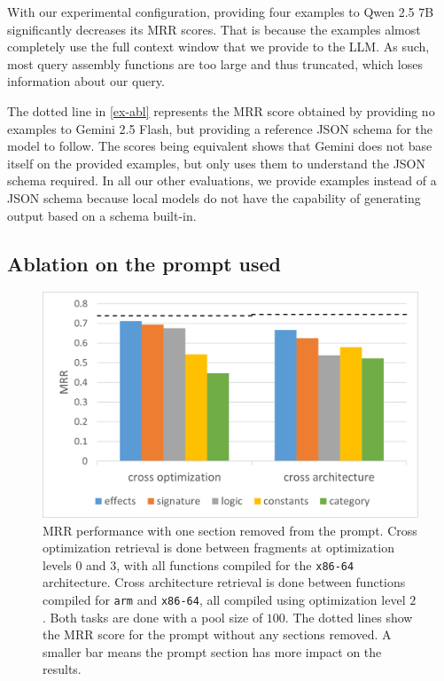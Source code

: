 With our experimental configuration, providing four examples to Qwen 2.5 \(7\)B significantly decreases its MRR scores. That is because
the examples almost completely use the full context window that we provide to the LLM. As such, most query assembly functions are
too large and thus truncated, which loses information about our query.

The dotted line in \autoref{ex-abl} represents the MRR score obtained by providing no examples to Gemini 2.5 Flash, but providing a reference JSON
schema for the model to follow. The scores being equivalent shows that Gemini does not base itself on the provided examples, but only
uses them to understand the JSON schema required. In all our other evaluations, we provide examples instead of a JSON schema because local
models do not have the capability of generating output based on a schema built-in.

\subsection{Ablation on the prompt used}

\begin{figure}[htbp]
\centerline{\includegraphics[width=\linewidth]{prompt-ablation}}
\caption{
MRR performance with one section removed from the prompt. Cross optimization retrieval is done between fragments at
optimization levels \(0\) and \(3\), with all functions compiled for the \texttt{x86-64} architecture. Cross architecture retrieval is done between functions
compiled for \texttt{arm} and \texttt{x86-64}, all compiled using optimization level \(2\). Both tasks are done with a pool size of \(100\). The dotted lines
show the MRR score for the prompt without any sections removed. A smaller bar means the prompt section has more impact on the results.}
\label{prompt-abl}
\end{figure}

